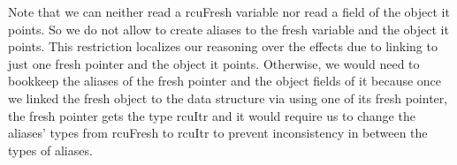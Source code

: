 Note that we can neither read a \textsf{rcuFresh} variable nor read a field of the object it points. So we do not allow to create aliases to the fresh variable and the object it points. This restriction localizes our reasoning over the effects due to linking to just one fresh pointer and the object it points. Otherwise, we would need to bookkeep the aliases of the fresh pointer and the object fields of it because once we linked the fresh object to the data structure via using one of its fresh pointer, the fresh pointer gets the type \textsf{rcuItr} and it would require us to change the aliases' types from \textsf{rcuFresh} to \textsf{rcuItr} to prevent inconsistency in between the types of aliases.\begin{comment}
 \begin{figure}[H]
 \centering
 \begin{tikzpicture}[>=stealth',node distance=1.3cm,semithick,auto]
 \tikzstyle{hollow node}=[circle,draw,inner sep=1]
 \tikzstyle{sub node}=[triangle,draw,inner sep=1]
 \tikzstyle{solid node}=[rectangle,draw,inner sep=1.5]
 \tikzstyle{solids node}=[rectangle,draw=red,inner sep=1.5]
  \tikzstyle{solidss node}=[dashed,rectangle,draw=red,inner sep=1.5]
  \tikzstyle{freshollow node}=[dashed,circle,draw=green,inner sep=1]

 \tikzstyle{fresh node}=[dashed,rectangle,draw=green,inner sep=1.5]
  
 \tikzstyle{null node}=[circle,draw=red,fill=red]
 \tikzset{
 	red node/.style={rectangle,draw=black,fill=red,inner sep=1.5},
 	blue node/.style={rectangle,draw=black,inner sep=1.5},
 	reader node/.style={circle,draw=black,inner sep=1},
        redreader node/.style={circle,draw=red,inner sep=1},
        readerr node/.style={dashed,circle,draw=black,inner sep=1},
 	writer node/.style={circle,draw=black,inner sep=1}
 }

       \node[solid node] (R) {$R$};
       \node[solid node] (0) [right of=R] {$H_0$};
       \node[solid node] (1) [right of=0] {$H_1$};
       \node[fresh node] (2) [above of=1] {$H_f$};
       \node[solid node] (3) [right of=1] {$H_2$};
       \node[solid node] (4) [above  of=3] {$H_4$};

       \node[reader node] (r0) [below  of= 0]  {$pr$};
       \node[reader node] (r1) [below  of= 1]  {$cr$};
       \node[freshollow node] (f)  [left  of= 2] {$cf$};
        \node[reader node] (crl)  [below right  of= 3] {$crl$};
        \node[reader node] (lm) [right  of= 4]  {$lm$};



\end{comment}
